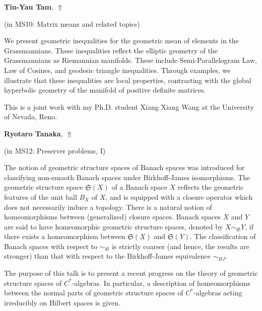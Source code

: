 \documentclass[ILAS2025-program.tex]{subfiles}
\begin{document}
\hypertarget{down0255}{}\begin{ilasabstract}
    
\textbf{Tin-Yau Tam},  \hfill \hyperlink{up0255}{$\Uparrow$}
    
    
(in {\color{mstitle}MS10: Matrix means and related topics})
        
\mtskip
    We present geometric inequalities for the geometric mean of  elements in the Grassmannians. These inequalities reflect the elliptic geometry of the Grassmannians as Riemannian manifolds. These include Semi-Parallelogram Law, Law of Cosines, and geodesic triangle inequalities. Through examples, we illustrate that these inequalities are local properties, contrasting with the global hyperbolic geometry of the manifold of positive definite matrices.

This is a joint work with my Ph.D. student  Xiang Xiang Wang at the University of Nevada, Reno.
\end{ilasabstract}
    

\hypertarget{down0162}{}\begin{ilasabstract}
    
\textbf{Ryotaro Tanaka},  \hfill \hyperlink{up0162}{$\Uparrow$}
    
    
(in {\color{mstitle}MS12: Preserver problems, I})
        
\mtskip
    The notion of geometric structure spaces of Banach spaces was introduced for classifying non-smooth Banach spaces under Birkhoff-James isomorphisms. The geometric structure space $\mathfrak{S}(X)$ of a Banach space $X$ reflects the geometric features of the unit ball $B_X$ of $X$, and is equipped with a closure operator which does not necessarily induce a topology. There is a natural notion of homeomorphisms between (generalized) closure spaces. Banach spaces $X$ and $Y$ are said to have homeomorphic geometric structure spaces, denoted by $X\sim_\mathfrak{S} Y$, if there exists a homeomorphism between $\mathfrak{S} (X)$ and $\mathfrak{S} (Y)$. The classification of Banach spaces with respect to $\sim_\mathfrak{S}$ is strictly coarser (and hence, the results are stronger) than that with respect to the Birkhoff-James equivalence $\sim_{BJ}$.

The purpose of this talk is to present a recent progress on the theory of geometric structure spaces of $C^*$-algebras. In particular, a description of homeomorphisms between the normal parts of geometric structure spaces of $C^*$-algebras acting irreducibly on Hilbert spaces is given.

\end{ilasabstract}
    
\end{document}
